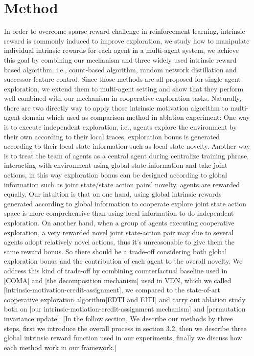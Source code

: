 \documentclass{article} %
\begin{document}
\section{Method}
In order to overcome sparse reward challenge in reinforcement learning, intrinsic reward is commonly induced to improve exploration, we study how to manipulate individual intrinsic rewards for each agent in a multi-agent system, we achieve this goal by combining our mechanism and three widely used intrinsic reward based algorithm, i.e., count-based algorithm, random network distillation and successor feature control. Since those methods are all proposed for single-agent exploration, we extend them to multi-agent setting and show that they perform well combined with our mechanism in cooperative exploration tasks. Naturally, there are two directly way to apply those intrinsic motivation algorithm to multi-agent domain which used as comparison method in ablation experiment: One way is to execute independent exploration, i.e., agents explore the environment by their own according to their local traces, exploration bonus is generated according to their local state information such as local state novelty. Another way is to treat the team of agents as a central agent during centralize training phrase, interacting with environment using global state information and take joint actions, in this way exploration bonus can be designed according to global information such as joint state/state action pairs' novelty, agents are rewarded equally. Our intuition is that on one hand, using global intrinsic rewards generated according to global information to cooperate explore joint state action space is more comprehensive than using local information to do independent exploration. On another hand, when a group of agents executing cooperative exploration, a very rewarded novel joint state-action pair may due to several agents adopt relatively novel actions, thus it's unreasonable to give them the same reward bonus. So there should be a trade-off considering both global exploration bonus and the contribution of each agent to the overall novelty. We address this kind of trade-off by combining counterfactual baseline used in [COMA] and [the decomposition mechanism] used in VDN, which we called [intrinsic-motivation-credit-assignment], we compared to the state-of-art cooperative exploration algorithm[EDTI and EITI] and carry out ablation study both on [our intrinsic-motiation-credit-assignment mechanism] and [permutation invariance update]. [In the follow section, We describe our methods by three steps, first we introduce the overall process in section 3.2, then we describe three global intrinsic reward function used in our experiments, finally we discuss how each method work in our framework.]
\end{document}
